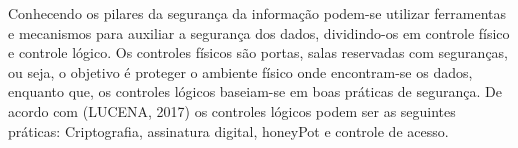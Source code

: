 Conhecendo os pilares da segurança da informação podem-se utilizar ferramentas e mecanismos para auxiliar a segurança dos dados, dividindo-os em controle físico e controle lógico. Os controles físicos são portas, salas reservadas com seguranças, ou seja, o objetivo é proteger o ambiente físico onde encontram-se os dados, enquanto que, os controles lógicos baseiam-se em boas práticas de segurança. De acordo com (LUCENA, 2017) os controles lógicos podem ser as seguintes práticas: Criptografia, assinatura digital, honeyPot e controle de acesso.

